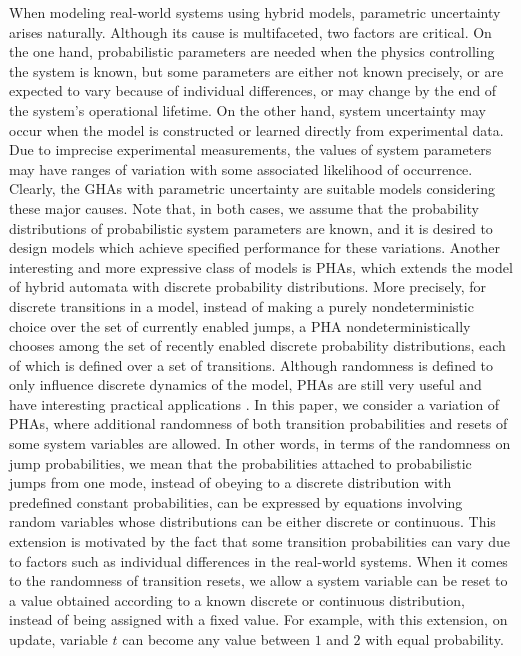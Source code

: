 When modeling real-world systems using hybrid models, parametric uncertainty arises naturally. Although its cause is multifaceted, two factors are critical. On the one hand, probabilistic parameters are needed when the physics controlling the system is known, but some parameters are either not known precisely, or are expected to vary because of individual differences, or may change by the end of the system's operational lifetime. On the other hand, system uncertainty may occur when the model is constructed or learned directly from experimental data. Due to imprecise experimental measurements, the values of system parameters may have ranges of variation with some associated likelihood of occurrence. Clearly, the GHAs with parametric uncertainty are suitable models considering these major causes. Note that, in both cases, we assume that the probability distributions of probabilistic system parameters are known, and it is desired to design models which achieve specified performance for these variations. Another interesting and more expressive class of models is PHAs, which extends the model of hybrid automata \cite{henzinger2000theory} with discrete probability distributions. More precisely, for discrete transitions in a model, instead of making a purely nondeterministic choice over the set of currently enabled jumps, a PHA nondeterministically chooses among the set of recently enabled discrete probability distributions, each of which is defined over a set of transitions. Although randomness is defined to only influence discrete dynamics of the model, PHAs are still very useful and have interesting practical applications \cite{spr2001thesis}. In this paper, we consider a variation of PHAs, where additional randomness of both transition probabilities and resets of some system variables are allowed. In other words, in terms of the randomness on jump probabilities, we mean that the probabilities attached to probabilistic jumps from one mode, instead of obeying to a discrete distribution with predefined constant probabilities, can be expressed by equations involving random variables whose distributions can be either discrete or continuous. This extension is motivated by the fact that some transition probabilities can vary due to factors such as individual differences in the real-world systems. When it comes to the randomness of transition resets, we allow a system variable can be reset to a value obtained according to a known discrete or continuous distribution, instead of being assigned with a fixed value. For example, with this extension, on update, variable $t$ can become any value between $1$ and $2$ with equal probability. 

